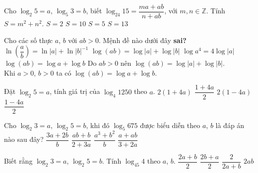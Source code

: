 \begin{ex}
	Cho $\log_2 5=a$, $\log_5 3=b$, biết $\log_{24} 15=\dfrac{ma+ab}{n+ab}$, với $m, n\in \mathbb{Z}$. Tính $S=m^2+n^2$.
	\choice
	{$S=2$}
	{\True $S=10$}
	{$S=5$}
	{$S=13$}
\end{ex}
\begin{ex}
	Cho các số thực $a$, $b$ với $ab>0$. Mệnh đề nào dưới đây \textbf{sai?}
	\choice
	{$\ln \left(\dfrac{a}{b}\right)=\ln |a|+\ln |b|^{-1}$}
	{$\log(ab)=\log|a|+\log|b|$}
	{$\log a^4=4\log|a|$}
	{\True $\log(ab)=\log a+\log b$}
	\loigiai
	{
		Do $ab>0$ nên $\log(ab)=\log|a|+\log|b|$.\\
		Khi $a>0$, $b>0$ ta có $\log(ab)=\log a+\log b$.
	}
\end{ex}

\begin{ex}
	Đặt $\log_2 5=a$, tính giá trị của $\log_4 1250$ theo $a$.
	\choice
	{$2(1+4a)$}
	{\True $\dfrac{1+4a}{2}$}
	{$2(1-4a)$}
	{$\dfrac{1-4a}{2}$}
\end{ex}
\begin{ex}
	Cho $\log_2 3 = a$, $\log_2 5 = b$, khi đó $\log_5 675$ được biểu diễn theo $a$, $b$ là đáp án nào sau đây?
	\choice
	{\True $\dfrac{3a + 2b}{b} $}
	{$ \dfrac{ab + b}{2+3a} $}
	{$ \dfrac{a^3 + b^2}{b} $}
	{ $\dfrac{a + ab}{3 + 2a}$ }
\end{ex}

\begin{ex}
	Biết rằng $\log_2 3=a$, $\log_2 5=b$. Tính $\log_{45} 4$ theo $a$, $b$.
	\choice
	{$\dfrac{2a+b}{2}$}
	{$\dfrac{2b+a}{2}$}
	{\True $\dfrac{2}{2a+b}$}
	{$2ab$}
\end{ex}

